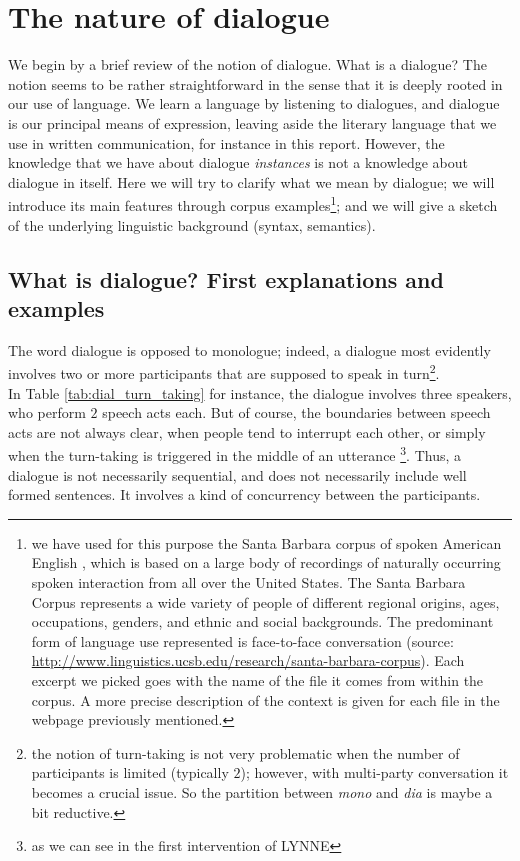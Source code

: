 \documentclass[11pt]{article}
\begin{document}
	\section{The nature of dialogue}
		We begin by a brief review of the notion of dialogue. What is a dialogue? The notion seems to be rather straightforward in the sense that it is deeply rooted in our use of language. We learn a language by listening to dialogues, and dialogue is our principal means of expression, leaving aside the literary language that we use in written communication, for instance in this report. However, the knowledge that we have about dialogue \textit{instances} is not a knowledge about dialogue in itself. Here we will try to clarify what we mean by dialogue; we will introduce its main features through corpus examples\footnote{we have used for this purpose the Santa Barbara corpus of spoken American English \cite{dubois2000}, which is based on a large body of recordings of naturally occurring spoken interaction from all over the United States. The Santa Barbara Corpus represents a wide variety of people of different regional origins, ages, occupations, genders, and ethnic and social backgrounds. The predominant form of language use represented is face-to-face conversation (source: \href{http://www.linguistics.ucsb.edu/research/santa-barbara-corpus}{http://www.linguistics.ucsb.edu/research/santa-barbara-corpus}). Each excerpt we picked goes with the name of the file it comes from within the corpus. A more precise description of the context is given for each file in the webpage previously mentioned.}; and we will give a sketch of the underlying linguistic background (syntax, semantics).
		\subsection{What is dialogue? First explanations and examples}
			The word dialogue is opposed to monologue; indeed, a dialogue most evidently involves two or more participants that are supposed to speak in turn\footnote{the notion of turn-taking is not very problematic when the number of participants is limited (typically $2$); however, with multi-party conversation it becomes a crucial issue. So the partition between \textit{mono} and \textit{dia} is maybe a bit reductive.}.\\
			
			In Table \ref{tab:dial_turn_taking} for instance, the dialogue involves three speakers, who perform $2$ speech acts each. But of course, the boundaries between speech acts are not always clear, when people tend to interrupt each other, or simply when the turn-taking is triggered in the middle of an utterance \footnote{as we can see in the first intervention of LYNNE}. Thus, a dialogue is not necessarily sequential, and does not necessarily include well formed sentences. It involves a kind of concurrency between the participants.
			
\end{document}
